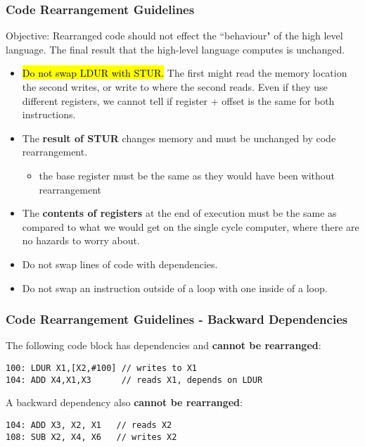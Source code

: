 \begin{frame}[fragile]\frametitle{Code Rearrangement Guidelines}

Objective: Rearranged code should not effect the ``behaviour" of the high level language. The final result that the high-level language computes is unchanged. 
\begin{itemize}

\item \hl{Do not swap LDUR with STUR.} The first might read the memory location the second writes, or write to where the second reads. Even if they use different registers, we cannot tell if register + offset is the same for both instructions.
\item The \textbf{result of STUR} changes memory and must be unchanged by code rearrangement.
\begin{itemize}
    \item the base register must be the same as they would have been without rearrangement
\end{itemize}
\item The \textbf{contents of registers} at the end of execution must be the same as compared to what we would get on the single cycle computer, where there are no hazards to worry about.
\item Do not swap lines of code with dependencies.
\item Do not swap an instruction outside of a loop with one inside of a loop.
\end{itemize}

\end{frame}

\begin{frame}[fragile]\frametitle{Code Rearrangement Guidelines - Backward Dependencies}

The following code block has dependencies and \textbf{cannot be rearranged}:
\begin{verbatim}
100: LDUR X1,[X2,#100] // writes to X1
104: ADD X4,X1,X3      // reads X1, depends on LDUR
\end{verbatim}
A backward dependency also \textbf{cannot be rearranged}:
\begin{verbatim}
104: ADD X3, X2, X1   // reads X2
108: SUB X2, X4, X6   // writes X2
\end{verbatim}

\end{frame}

